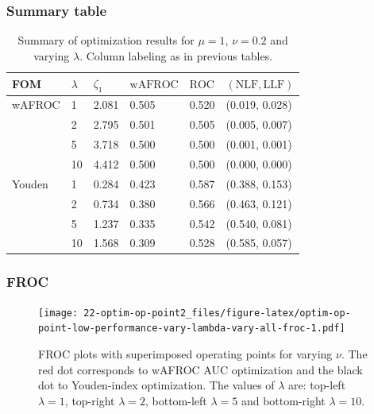 \documentclass[
]{book}
\begin{document}
\hypertarget{summary-table-7}{%
\subsubsection{Summary table}\label{summary-table-7}}

\begin{table}

\caption{\label{tab:optim-op-point-low-performance-vary-lambda-table-vary-all}Summary of optimization results for $\mu = 1$, $\nu = 0.2$ and varying $\lambda$. Column labeling as in previous tables.}
\centering
\fontsize{10}{12}\selectfont
\begin{tabular}[t]{llllll}
\toprule
FOM & $\lambda$ & $\zeta_1$ & $\text{wAFROC}$ & $\text{ROC}$ & $\left( \text{NLF}, \text{LLF}\right)$\\
\midrule
wAFROC & 1 & 2.081 & 0.505 & 0.520 & (0.019, 0.028)\\
 & 2 & 2.795 & 0.501 & 0.505 & (0.005, 0.007)\\
 & 5 & 3.718 & 0.500 & 0.500 & (0.001, 0.001)\\
 & 10 & 4.412 & 0.500 & 0.500 & (0.000, 0.000)\\
Youden & 1 & 0.284 & 0.423 & 0.587 & (0.388, 0.153)\\
\addlinespace
 & 2 & 0.734 & 0.380 & 0.566 & (0.463, 0.121)\\
 & 5 & 1.237 & 0.335 & 0.542 & (0.540, 0.081)\\
 & 10 & 1.568 & 0.309 & 0.528 & (0.585, 0.057)\\
\bottomrule
\end{tabular}
\end{table}

\hypertarget{froc-8}{%
\subsubsection{FROC}\label{froc-8}}

\begin{figure}
\centering
\texttt{[image: 22-optim-op-point2\_files/figure-latex/optim-op-point-low-performance-vary-lambda-vary-all-froc-1.pdf]}
\caption{\label{fig:optim-op-point-low-performance-vary-lambda-vary-all-froc}FROC plots with superimposed operating points for varying \(\nu\). The red dot corresponds to wAFROC AUC optimization and the black dot to Youden-index optimization. The values of \(\lambda\) are: top-left \(\lambda = 1\), top-right \(\lambda = 2\), bottom-left \(\lambda = 5\) and bottom-right \(\lambda = 10\).}
\end{figure}
\end{document}
